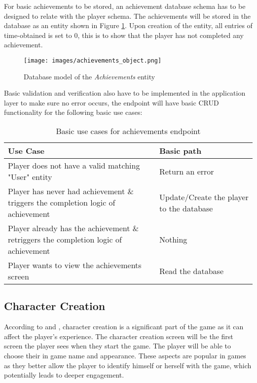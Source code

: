 For basic achievements to be stored, an achievement database schema has to be designed to relate with the player schema. The achievements will be stored in the database as an entity shown in Figure \ref{fig:achievements_object}. Upon creation of the entity, all entries of time-obtained is set to 0, this is to show that the player has not completed any achievement.
\begin{figure}[H]
    \centering
    \texttt{[image: images/achievements\_object.png]}
    \caption{Database model of the \textit{Achievements} entity}    
    \label{fig:achievements_object}
\end{figure}
Basic validation and verification also have to be implemented in the application layer to make sure no error occurs, the endpoint will have basic CRUD functionality for the following basic use cases:
\begin{table}[H]
    \caption{Basic use cases for achievements endpoint}
    \begin{tabular}{|p{11cm}|p{5cm}|}
        \hline
        Use Case & Basic path\\
        \hline
        Player does not have a valid matching "User" entity & Return an error\\
        \hline
        Player has never had achievement \& triggers the completion logic of achievement & Update/Create the player to the database\\
        \hline
        Player already has the achievement \& retriggers the completion logic of achievement & Nothing \\
        \hline
        Player wants to view the achievements screen & Read the database\\
        \hline
    \end{tabular}
\end{table}
\subsection{Character Creation}
According to \cite{anastasio26impact} and \cite{adams2013crash}, character creation is a significant part of the game as it can affect the player's experience. The character creation screen will be the first screen the player sees when they start the game. The player will be able to choose their in game name and appearance. These aspects are popular in games as they better allow the player to identify himself or herself with the game, which potentially leads to deeper engagement.

